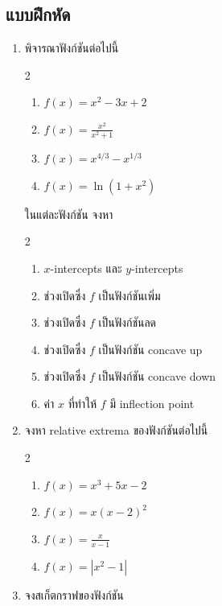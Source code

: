 \documentclass[
]{book}
\begin{document}
\subsection{แบบฝึกหัด}\label{uxe41uxe1auxe1auxe1duxe01uxe2buxe14-4}

\begin{enumerate}
\def\labelenumi{\arabic{enumi}.}
\item
  พิจารณาฟังก์ชันต่อไปนี้

  2

  \begin{enumerate}
  \def\labelenumii{\arabic{enumii}.}
  \item
    \(\displaystyle f(x) = x^2-3x+2\)
  \item
    \(\displaystyle f(x) = \frac{x^2}{x^2+1}\)
  \item
    \(\displaystyle f(x) = x^{4/3} - x^{1/3}\)
  \item
    \(\displaystyle f(x) = \ln(1+x^2)\)
  \end{enumerate}

  ในแต่ละฟังก์ชัน จงหา

  2

  \begin{enumerate}
  \def\labelenumii{\arabic{enumii}.}
  \item
    \(x\)-intercepts และ \(y\)-intercepts
  \item
    ช่วงเปิดซึ่ง \(f\) เป็นฟังก์ชันเพิ่ม
  \item
    ช่วงเปิดซึ่ง \(f\) เป็นฟังก์ชันลด
  \item
    ช่วงเปิดซึ่ง \(f\) เป็นฟังก์ชัน concave up
  \item
    ช่วงเปิดซึ่ง \(f\) เป็นฟังก์ชัน concave down
  \item
    ค่า \(x\) ที่ทำให้ \(f\) มี inflection point
  \end{enumerate}
\item
  จงหา relative extrema ของฟังก์ชันต่อไปนี้

  2

  \begin{enumerate}
  \def\labelenumii{\arabic{enumii}.}
  \item
    \(\displaystyle f(x) = x^3+5x-2\)
  \item
    \(\displaystyle f(x) = x(x-2)^2\)
  \item
    \(\displaystyle f(x) = \frac{x}{x-1}\)
  \item
    \(\displaystyle f(x) = |x^2-1|\)
  \end{enumerate}
\item
  จงสเก็ตกราฟของฟังก์ชัน


\end{enumerate}
\end{document}
